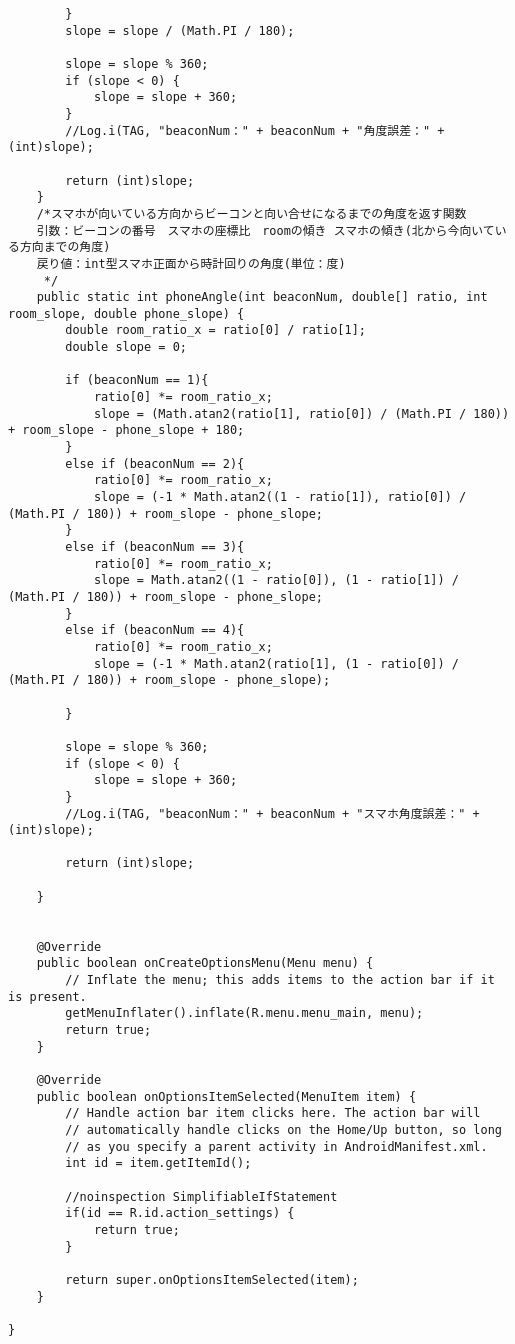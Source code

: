 \documentclass[11pt,a4j]{jarticle}
\begin{document}
\begin{verbatim}
        }
        slope = slope / (Math.PI / 180);

        slope = slope % 360;
        if (slope < 0) {
            slope = slope + 360;
        }
        //Log.i(TAG, "beaconNum：" + beaconNum + "角度誤差：" + (int)slope);

        return (int)slope;
    }
    /*スマホが向いている方向からビーコンと向い合せになるまでの角度を返す関数
    引数：ビーコンの番号　スマホの座標比　roomの傾き スマホの傾き(北から今向いている方向までの角度)
    戻り値：int型スマホ正面から時計回りの角度(単位：度)
     */
    public static int phoneAngle(int beaconNum, double[] ratio, int room_slope, double phone_slope) {
        double room_ratio_x = ratio[0] / ratio[1];
        double slope = 0;

        if (beaconNum == 1){
            ratio[0] *= room_ratio_x;
            slope = (Math.atan2(ratio[1], ratio[0]) / (Math.PI / 180)) + room_slope - phone_slope + 180;
        }
        else if (beaconNum == 2){
            ratio[0] *= room_ratio_x;
            slope = (-1 * Math.atan2((1 - ratio[1]), ratio[0]) / (Math.PI / 180)) + room_slope - phone_slope;
        }
        else if (beaconNum == 3){
            ratio[0] *= room_ratio_x;
            slope = Math.atan2((1 - ratio[0]), (1 - ratio[1]) / (Math.PI / 180)) + room_slope - phone_slope;
        }
        else if (beaconNum == 4){
            ratio[0] *= room_ratio_x;
            slope = (-1 * Math.atan2(ratio[1], (1 - ratio[0]) / (Math.PI / 180)) + room_slope - phone_slope);

        }

        slope = slope % 360;
        if (slope < 0) {
            slope = slope + 360;
        }
        //Log.i(TAG, "beaconNum：" + beaconNum + "スマホ角度誤差：" + (int)slope);

        return (int)slope;

    }


    @Override
    public boolean onCreateOptionsMenu(Menu menu) {
        // Inflate the menu; this adds items to the action bar if it is present.
        getMenuInflater().inflate(R.menu.menu_main, menu);
        return true;
    }

    @Override
    public boolean onOptionsItemSelected(MenuItem item) {
        // Handle action bar item clicks here. The action bar will
        // automatically handle clicks on the Home/Up button, so long
        // as you specify a parent activity in AndroidManifest.xml.
        int id = item.getItemId();

        //noinspection SimplifiableIfStatement
        if(id == R.id.action_settings) {
            return true;
        }

        return super.onOptionsItemSelected(item);
    }

}

\end{verbatim}
\end{document}
